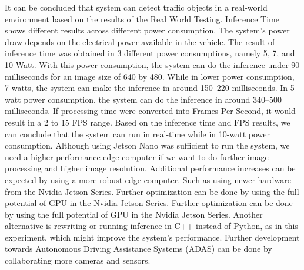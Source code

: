 \documentclass[conference]{IEEEtran}
\begin{document}
It can be concluded that system can detect traffic objects in a real-world environment based on the results of the Real World Testing. Inference Time shows different results across different power consumption.
The system's power draw depends on the electrical power available in the vehicle. The result of inference time was obtained in 3 different power consumptions, namely 5, 7, and 10 Watt. With this power consumption, the system can do the inference under
90 milliseconds for an image size of 640 by 480. While in lower power consumption, 7 watts, the system can make the inference in around 150–220 milliseconds.
In 5-watt power consumption, the system can do the inference in around 340–500 milliseconds. If processing time were converted into Frames Per Second, it would result in a 2 to 15 FPS range. Based on the inference time and FPS results, we can conclude that the system can run in real-time while in 10-watt power consumption.
Although using Jetson Nano was sufficient to run the system, we need a higher-performance edge computer if we want to do further image processing and higher image resolution. Additional performance increases can be expected by using a more robust edge computer. Such as using newer hardware from the Nvidia Jetson Series. Further optimization can be done by using the full potential of GPU in the Nvidia Jetson Series.
Further optimization can be done by using the full potential of GPU in the Nvidia Jetson Series. Another alternative is rewriting or running inference in C++ instead of Python, as in this experiment, which might improve the system's performance.
Further development towards Autonomous Driving Assistance Systems (ADAS) can be done by collaborating more cameras and sensors.
\end{document}
